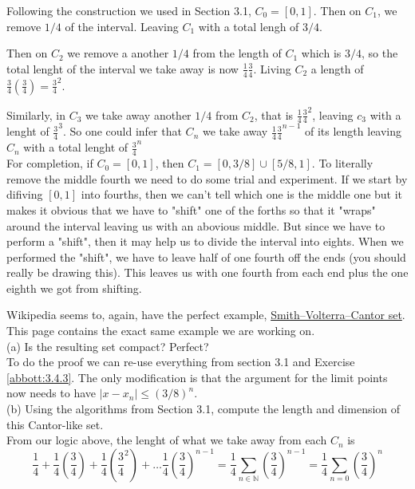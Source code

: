 Following the construction we used in Section 3.1, $C_0 = [0,1]$.
Then on $C_1$, we remove $1/4$ of the interval. Leaving $C_1$ with a total lengh of $3/4$.

Then on $C_2$ we remove a another $1/4$ from the length of $C_1$ which is $3/4$, so the total lenght
of the interval we take away is now $\frac{1}{4} \frac{3}{4}$.
Living $C_2$ a length of $\frac{3}{4}\left(\frac{3}{4}\right) = \frac{3}{4}^2$.

Similarly, in $C_3$ we take away another $1/4$ from $C_2$, that is $\frac{1}{4} \frac{3}{4}^2$,
leaving $c_3$ with a lenght of $\frac{3}{4}^3$.
So one could infer that $C_n$ we take away $\frac{1}{4} \frac{3}{4}^{n-1}$ of its length
leaving $C_n$ with a total lenght of $\frac{3}{4}^{n}$
\\

For completion, if $C_0 = [0,1]$, then $C_1 = [0, 3/8] \cup [5/8, 1]$.
To literally remove the middle fourth we need to do some trial and experiment.
If we start by difiving $[0,1]$ into fourths, then we can't tell which one is the middle one but it makes it
obvious that we have to "shift" one of the forths so that it "wraps" around the interval leaving us with an
abovious middle.
But since we have to perform a "shift", then it may help us to divide the interval into eights.
When we performed the "shift", we have to leave half of one fourth off the ends (you should really be drawing this).
This leaves us with one fourth from each end plus the one eighth we got from shifting.

Wikipedia seems to, again, have the perfect example, \href{https://en.wikipedia.org/wiki/Smith%E2%80%93Volterra%E2%80%93Cantor_set}{Smith–Volterra–Cantor set}.
This page contains the exact same example we are working on.
\\



(a) Is the resulting set compact? Perfect?
\\

To do the proof we can re-use everything from section 3.1 and Exercise \ref{abbott:3.4.3}.
The only modification is that the argument for the limit points now needs to have
$|x - x_n| \leq \left(3/8\right)^n$.
\\


(b) Using the algorithms from Section 3.1, compute the length and dimension of this Cantor-like set.
\\

From our logic above, the lenght of what we take away from each $C_n$ is
$$
\frac{1}{4} + \frac{1}{4} \left(\frac{3}{4}\right) + \frac{1}{4} \left(\frac{3}{4}^2\right) + \ldots \frac{1}{4} \left(\frac{3}{4}\right)^{n-1}
= \frac{1}{4} \sum_{n\in\mathbb{N}} \left(\frac{3}{4}\right)^{n-1}
= \frac{1}{4} \sum_{n=0} \left(\frac{3}{4}\right)^n
$$

